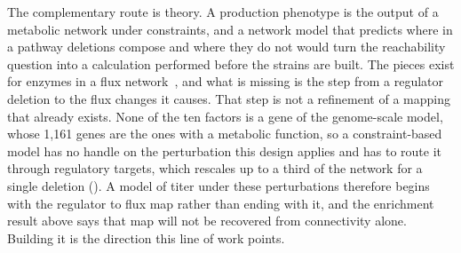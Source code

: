The complementary route is theory. A production phenotype is the output of a metabolic
network under constraints, and a network model that predicts where in a pathway deletions
compose and where they do not would turn the reachability question into a calculation
performed before the strains are built. The pieces exist for enzymes in a flux
network~\citep{segreModularEpistasisYeast2005,kryazhimskiyEmergencePropagationEpistasis2021},
and what is missing is the step from a regulator deletion to the flux changes it causes.
That step is not a refinement of a mapping that already exists. None of the ten factors is
a gene of the genome-scale model, whose 1{,}161 genes are the ones with a metabolic
function, so a constraint-based model has no handle on the perturbation this design applies
and has to route it through regulatory targets, which rescales up to a third of the network
for a single deletion (). A model of titer under these
perturbations therefore begins with the regulator to flux map rather than ending with it,
and the enrichment result above says that map will not be recovered from connectivity
alone. Building it is the direction this line of work points.
